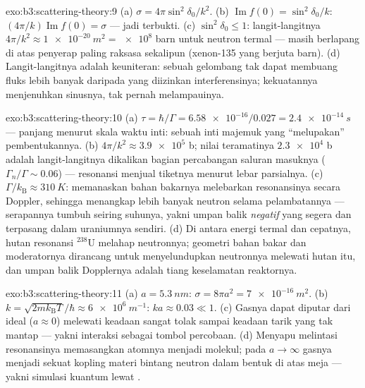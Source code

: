\begin{solution}{exo:b3:scattering-theory:9}
(a) $\sigma = 4\pi\sin^2\delta_0/k^2$. (b) $\operatorname{Im}f(0)
= \sin^2\delta_0/k$: $(4\pi/k)\operatorname{Im}f(0) = \sigma$ ---
jadi terbukti. (c) $\sin^2\delta_0 \le 1$: langit-langitnya $4\pi/k^2 \approx
\qty{1e-20}{m^2} = \num{e8}$ barn untuk neutron termal --- masih
berlapang di atas penyerap paling raksasa sekalipun (xenon-135 yang
berjuta barn). (d) Langit-langitnya adalah keuniteran: sebuah gelombang
tak dapat membuang fluks lebih banyak daripada yang diizinkan
interferensinya; kekuatannya menjenuhkan sinusnya, tak pernah
melampauinya.
\end{solution}

\begin{solution}{exo:b3:scattering-theory:10}
(a) $\tau = \hbar/\Gamma = \num{6.58e-16}/0.027 =
\qty{2.4e-14}{s}$ --- panjang menurut skala waktu inti: sebuah inti
majemuk yang ``melupakan'' pembentukannya. (b) $4\pi/k^2 \approx
\num{3.9e5}$ b; nilai teramatinya $\num{2.3e4}$ b adalah
langit-langitnya dikalikan bagian percabangan saluran masuknya
($\Gamma_n/\Gamma
\sim 0.06$) --- resonansi menjual tiketnya menurut lebar parsialnya. (c)
$\Gamma/k_{\text{B}} \approx \qty{310}{K}$: memanaskan bahan bakarnya
melebarkan resonansinya secara Doppler, sehingga menangkap lebih banyak
neutron selama pelambatannya --- serapannya tumbuh seiring suhunya,
yakni umpan balik \emph{negatif} yang segera dan terpasang dalam
uraniumnya sendiri. (d) Di antara energi termal dan cepatnya, hutan
resonansi $^{238}$U melahap neutronnya; geometri bahan bakar dan
moderatornya dirancang untuk menyelundupkan neutronnya melewati hutan
itu, dan umpan balik Dopplernya adalah tiang keselamatan reaktornya.
\end{solution}

\begin{solution}{exo:b3:scattering-theory:11}
(a) $a = \qty{5.3}{nm}$: $\sigma = 8\pi a^2 = \qty{7e-16}{m^2}$.
(b) $k = \sqrt{2mk_{\text{B}}T}/\hbar \approx \qty{6e6}{m^{-1}}$:
$ka \approx 0.03 \ll 1$. (c) Gasnya dapat diputar dari ideal
($a \approx 0$) melewati keadaan sangat tolak sampai keadaan tarik yang
tak mantap --- yakni interaksi sebagai tombol percobaan. (d) Menyapu
melintasi resonansinya memasangkan atomnya menjadi molekul; pada $a \to
\infty$ gasnya menjadi sekuat kopling materi bintang neutron dalam
bentuk di atas meja --- yakni simulasi kuantum lewat .
\end{solution}

